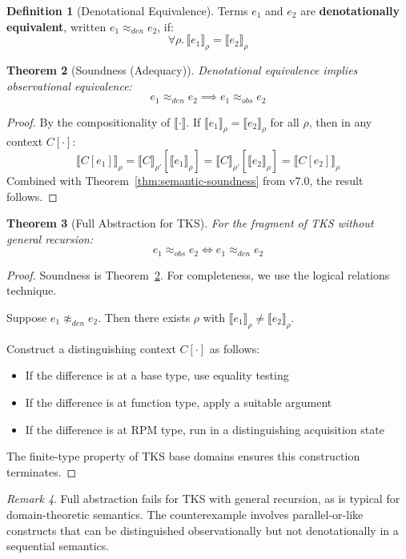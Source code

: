 \documentclass[11pt,twoside,openright]{book}
\theoremstyle{definition}
\newtheorem{definition}{Definition}[chapter]
\theoremstyle{plain}
\newtheorem{theorem}[definition]{Theorem}
\theoremstyle{remark}
\newtheorem{remark}[definition]{Remark}
\newcommand{\sem}[1]{\llbracket #1 \rrbracket}
\begin{document}
\begin{definition}[Denotational Equivalence]
\label{def:den-equiv}
Terms $e_1$ and $e_2$ are \textbf{denotationally equivalent}, written $e_1 \approx_{den} e_2$, if:
\[
\forall \rho.\, \sem{e_1}_\rho = \sem{e_2}_\rho
\]
\end{definition}

\begin{theorem}[Soundness (Adequacy)]
\label{thm:adequacy-full}
Denotational equivalence implies observational equivalence:
\[
e_1 \approx_{den} e_2 \implies e_1 \approx_{obs} e_2
\]
\end{theorem}

\begin{proof}
By the compositionality of $\sem{\cdot}$. If $\sem{e_1}_\rho = \sem{e_2}_\rho$ for all $\rho$, then in any context $C[\cdot]$:
\[
\sem{C[e_1]}_\rho = \sem{C}_{\rho'}[\sem{e_1}_\rho] = \sem{C}_{\rho'}[\sem{e_2}_\rho] = \sem{C[e_2]}_\rho
\]
Combined with Theorem~\ref{thm:semantic-soundness} from v7.0, the result follows.
\end{proof}

\begin{theorem}[Full Abstraction for TKS]
\label{thm:full-abstraction}
For the fragment of TKS without general recursion:
\[
e_1 \approx_{obs} e_2 \iff e_1 \approx_{den} e_2
\]
\end{theorem}

\begin{proof}
Soundness is Theorem~\ref{thm:adequacy-full}. For completeness, we use the logical relations technique.

Suppose $e_1 \not\approx_{den} e_2$. Then there exists $\rho$ with $\sem{e_1}_\rho \neq \sem{e_2}_\rho$.

Construct a distinguishing context $C[\cdot]$ as follows:
\begin{itemize}
  \item If the difference is at a base type, use equality testing
  \item If the difference is at function type, apply a suitable argument
  \item If the difference is at RPM type, run in a distinguishing acquisition state
\end{itemize}

The finite-type property of TKS base domains ensures this construction terminates.
\end{proof}

\begin{remark}
Full abstraction fails for TKS with general recursion, as is typical for domain-theoretic semantics. The counterexample involves parallel-or-like constructs that can be distinguished observationally but not denotationally in a sequential semantics.
\end{remark}
\end{document}

